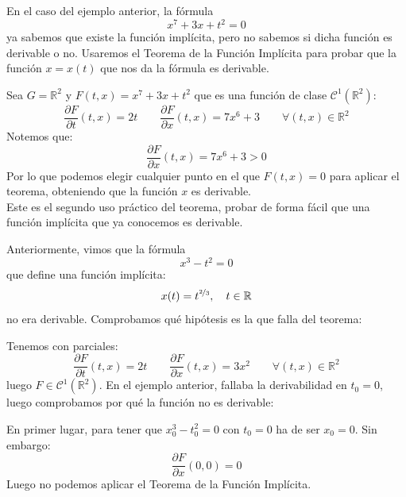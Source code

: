 \begin{ejemplo}
    En el caso del ejemplo anterior, la fórmula
    \begin{equation*}
        x^7+3x+t^2 = 0
    \end{equation*}
    ya sabemos que existe la función implícita, pero no sabemos si dicha función es derivable o no. Usaremos el Teorema de la Función Implícita para probar que la función $x=x(t)$ que nos da la fórmula es derivable.

    \noindent
    Sea $G = \mathbb{R}^2$ y $F(t,x) = x^7+3x+t^2$ que es una función de clase $\mathcal{C}^1(\mathbb{R}^2)$:
    \begin{equation*}
        \dfrac{\partial F}{\partial t}(t,x) = 2t \qquad \dfrac{\partial F}{\partial x}(t,x) = 7x^6 + 3 \qquad \forall (t,x)\in \mathbb{R}^2
    \end{equation*}
    Notemos que:
    \begin{equation*}
        \dfrac{\partial F}{\partial x}(t,x) = 7x^6 + 3 > 0
    \end{equation*}
    Por lo que podemos elegir cualquier punto en el que $F(t,x) = 0$ para aplicar el teorema, obteniendo que la función $x$ es derivable.\\

    Este es el segundo uso práctico del teorema, probar de forma fácil que una función implícita que ya conocemos es derivable.
\end{ejemplo}

\begin{ejemplo}
    Anteriormente, vimos que la fórmula
    \begin{equation*}
        x^3-t^2 = 0
    \end{equation*}
    que define una función implícita:
    \begin{equation*}
        x(t) = t^{\nicefrac{2}{3}}, \quad t\in \mathbb{R}
    \end{equation*}
    no era derivable. Comprobamos qué hipótesis es la que falla del teorema:

    \noindent
    Tenemos
    con parciales:
    \begin{equation*}
        \dfrac{\partial F}{\partial t}(t,x) = 2t \qquad \dfrac{\partial F}{\partial x}(t,x) = 3x^2 \qquad \forall (t,x)\in \mathbb{R}^2
    \end{equation*}
    luego $F\in \mathcal{C}^1(\mathbb{R}^2)$. En el ejemplo anterior, fallaba la derivabilidad en $t_0 = 0$, luego comprobamos por qué la función no es derivable:

    \noindent
    En primer lugar, para tener que $x_0^3 - t_0^2 = 0$ con $t_0 = 0$ ha de ser $x_0 = 0$. Sin embargo:
    \begin{equation*}
        \dfrac{\partial F}{\partial x}(0,0) = 0
    \end{equation*}
    Luego no podemos aplicar el Teorema de la Función Implícita.
\end{ejemplo}

